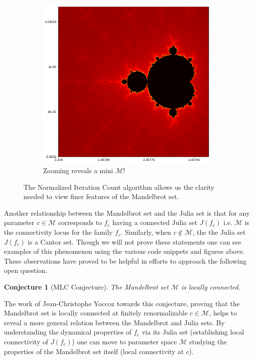 \documentclass{amsart}
\newcommand{\cal}[1]{ \mathcal{#1}}
\newcommand{\Mand}{\cal{M}}
\newtheorem{conj}[thm]{Conjecture}
\theoremstyle{definition}
\theoremstyle{remark}
\numberwithin{equation}{section}
\begin{document}
\begin{figure}[h]
\begin{subfigure}{.4\textwidth}
  \includegraphics[width=.8\linewidth]{Mandelbrot_c_zoom2.png}
  \caption{Zooming reveals a mini $\Mand$!}
\end{subfigure}
\caption{The Normalized Iteration Count algorithm allows us the clarity needed to view finer features of the Mandelbrot set.}
\label{fig:MandelbrotZoom}
\end{figure}

Another relationship between the Mandelbrot set and the Julia set is that for any parameter $c\in\Mand$ corresponds to $f_c$  having a connected Julia set $J(f_c)$ i.e. $\Mand$ is the connectivity locus for the family $f_c$. Similarly, when $c\notin\Mand$, the the Julia set $J(f_c)$ is a Cantor set. Though we will not prove these statements one can see examples of this phenomenon using the various code snippets and figures above. These observations have proved to be helpful in efforts to approach the following open question.

\begin{conj}[MLC Conjecture]
  The Mandelbrot set $\Mand$ is locally connected.
\end{conj}

The work of Jean-Christophe Yoccoz towards this conjecture, proving that the Mandelbrot set is locally connected at finitely renormalizable $c\in \Mand$, helps to reveal a more general relation between the Mandelbrot and Julia sets. By understanding the dynamical properties of $f_c$ via its Julia set (establishing local connectivity of $J(f_c)$) one can move to parameter space  $\Mand$ studying the properties of the Mandelbrot set itself (local connectivity at $c$).\\
\end{document}
